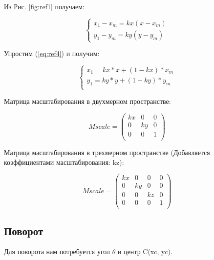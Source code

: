 Из Рис. \ref{fig:ref1} получаем:

\begin{equation}
	{\begin{cases}
			x_1 - x_m = kx(x - x_m) \\
			y_1 - y_m = ky(y - y_m)
			\label{eq:ref4}
		\end{cases}}
\end{equation}

Упростим (\ref{eq:ref4}) и получим:

\begin{equation}
	{\begin{cases}
			x_1 = kx * x + (1 - kx) * x_m \\
			y_1 = ky * y + (1 - ky) * y_m \\
		\end{cases}}
\end{equation}

Матрица масштабирования в двухмерном пространстве:

\begin{equation}
	Mscale = \left(
	\begin{array}{cccc}
			kx & 0  & 0 \\
			0  & ky & 0 \\
			0  & 0  & 1 \\
		\end{array}
	\right)
\end{equation}

Матрица масштабирования в трехмерном пространстве (Добавляется коэффициентами масштабирования: kz):

\begin{equation}
	Mscale = \left(
	\begin{array}{cccc}
			kx & 0  & 0  & 0 \\
			0  & ky & 0  & 0 \\
			0  & 0  & kz & 0 \\
			0  & 0  & 0  & 1 \\
		\end{array}
	\right)
\end{equation}

\subsection {Поворот}

Для поворота нам потребуется угол  $\theta$ и центр C(xc, yc).
\begin{figure}[ht!]
\end{figure}

